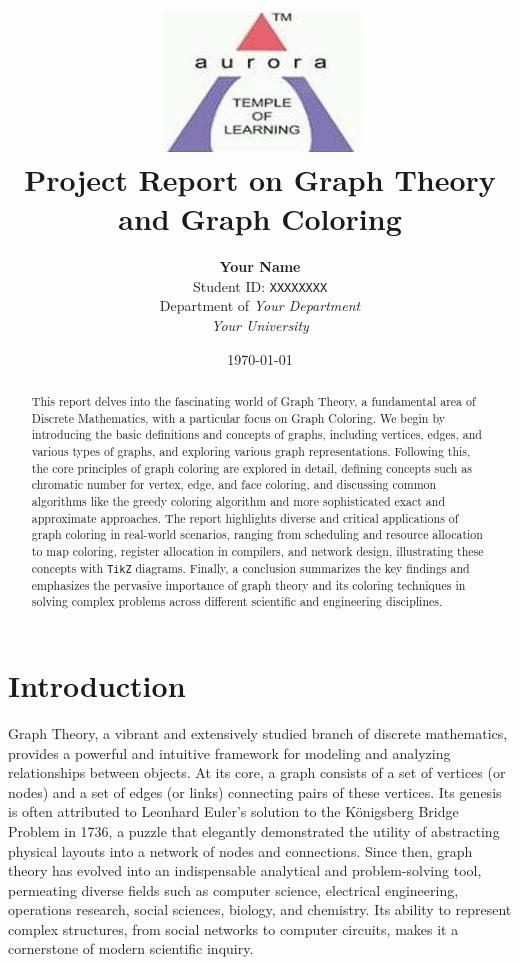 \documentclass[11pt, a4paper]{article}
\title{
    \vspace{-2cm} %
    \includegraphics[width=0.4\textwidth]{aurora_logo.png} \\ %
    \vspace{1cm} %
    \textbf{Project Report on Graph Theory and Graph Coloring}
}
\author{
    \textbf{Your Name} \\
    Student ID: \texttt{XXXXXXXX} \\
    Department of \textit{Your Department} \\
    \textit{Your University}
}
\date{\today} %
\begin{document}
\maketitle %

\thispagestyle{empty} %
\newpage

\pagestyle{reportstyle}

\begin{abstract}
This report delves into the fascinating world of Graph Theory, a fundamental area of Discrete Mathematics, with a particular focus on Graph Coloring. We begin by introducing the basic definitions and concepts of graphs, including vertices, edges, and various types of graphs, and exploring various graph representations. Following this, the core principles of graph coloring are explored in detail, defining concepts such as chromatic number for vertex, edge, and face coloring, and discussing common algorithms like the greedy coloring algorithm and more sophisticated exact and approximate approaches. The report highlights diverse and critical applications of graph coloring in real-world scenarios, ranging from scheduling and resource allocation to map coloring, register allocation in compilers, and network design, illustrating these concepts with \texttt{TikZ} diagrams. Finally, a conclusion summarizes the key findings and emphasizes the pervasive importance of graph theory and its coloring techniques in solving complex problems across different scientific and engineering disciplines.
\end{abstract}

\newpage
\tableofcontents %
\newpage

\section{Introduction}
Graph Theory, a vibrant and extensively studied branch of discrete mathematics, provides a powerful and intuitive framework for modeling and analyzing relationships between objects. At its core, a graph consists of a set of vertices (or nodes) and a set of edges (or links) connecting pairs of these vertices. Its genesis is often attributed to Leonhard Euler's solution to the Königsberg Bridge Problem in 1736, a puzzle that elegantly demonstrated the utility of abstracting physical layouts into a network of nodes and connections. Since then, graph theory has evolved into an indispensable analytical and problem-solving tool, permeating diverse fields such as computer science, electrical engineering, operations research, social sciences, biology, and chemistry. Its ability to represent complex structures, from social networks to computer circuits, makes it a cornerstone of modern scientific inquiry.
\end{document}
